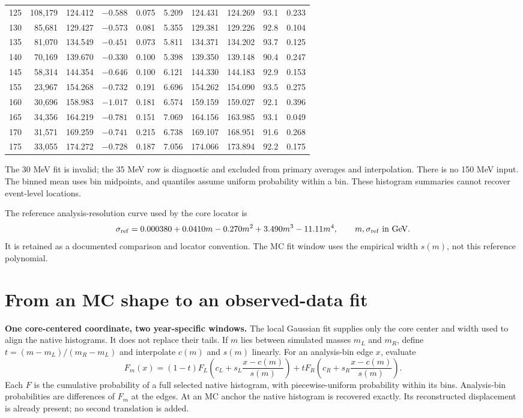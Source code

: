 \documentclass[11pt]{article}
\begin{document}
\begin{center}
\begin{tabular}{rrrrrrrrrr}
125 & 108,179 & 124.412 & $-0.588$ & 0.075 & 5.209 & 124.431 & 124.269 & 93.1 & 0.233\\
130 & 85,681 & 129.427 & $-0.573$ & 0.081 & 5.355 & 129.381 & 129.226 & 92.8 & 0.104\\
135 & 81,070 & 134.549 & $-0.451$ & 0.073 & 5.811 & 134.371 & 134.202 & 93.7 & 0.125\\
140 & 70,169 & 139.670 & $-0.330$ & 0.100 & 5.398 & 139.350 & 139.148 & 90.4 & 0.247\\
145 & 58,314 & 144.354 & $-0.646$ & 0.100 & 6.121 & 144.330 & 144.183 & 92.9 & 0.153\\
155 & 23,967 & 154.268 & $-0.732$ & 0.191 & 6.696 & 154.262 & 154.090 & 93.5 & 0.275\\
160 & 30,696 & 158.983 & $-1.017$ & 0.181 & 6.574 & 159.159 & 159.027 & 92.1 & 0.396\\
165 & 34,356 & 164.219 & $-0.781$ & 0.151 & 7.069 & 164.156 & 163.985 & 93.1 & 0.049\\
170 & 31,571 & 169.259 & $-0.741$ & 0.215 & 6.738 & 169.107 & 168.951 & 91.6 & 0.268\\
175 & 33,055 & 174.272 & $-0.728$ & 0.187 & 7.056 & 174.066 & 173.894 & 92.2 & 0.175\\
\bottomrule\end{tabular}\end{center}

The 30 MeV fit is invalid; the 35 MeV row is diagnostic and excluded from primary averages and interpolation. There is no 150 MeV input. The binned mean uses bin midpoints, and quantiles assume uniform probability within a bin. These histogram summaries cannot recover event-level locations.

The reference analysis-resolution curve used by the core locator is
\[
 \sigma_{\rm ref}=0.000380+0.0410m-0.270m^2+3.490m^3-11.11m^4,
 \qquad m,\sigma_{\rm ref}\ \hbox{in GeV}.
\]
It is retained as a documented comparison and locator convention. The MC fit window uses the empirical width $s(m)$, not this reference polynomial.


\clearpage\section*{From an MC shape to an observed-data fit}
\label{sec:method}

\textbf{One core-centered coordinate, two year-specific windows.} The local Gaussian fit supplies only the core center and width used to align the native histograms. It does not replace their tails. If $m$ lies between simulated masses $m_L$ and $m_R$, define $t=(m-m_L)/(m_R-m_L)$ and interpolate $c(m)$ and $s(m)$ linearly. For an analysis-bin edge $x$, evaluate
\[
 F_m(x)=(1-t)F_L\!\left(c_L+s_L\frac{x-c(m)}{s(m)}\right)
       +tF_R\!\left(c_R+s_R\frac{x-c(m)}{s(m)}\right).
\]
Each $F$ is the cumulative probability of a full selected native histogram, with piecewise-uniform probability within its bins. Analysis-bin probabilities are differences of $F_m$ at the edges. At an MC anchor the native histogram is recovered exactly. Its reconstructed displacement is already present; no second translation is added.
\end{document}
